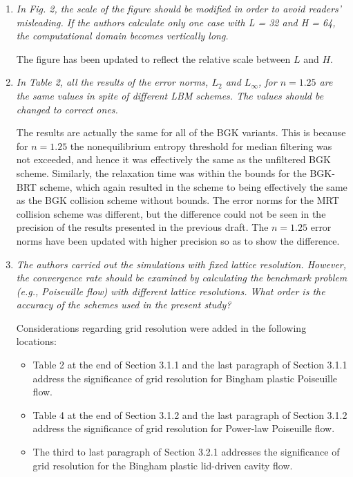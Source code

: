 \documentclass{article}
\begin{document}
	\begin{enumerate}
		\item \emph{In Fig. 2, the scale of the figure should be modified in order to avoid readers’ misleading. If the authors calculate only one case with L = 32 and H = 64, the computational domain becomes vertically long.}
		
		The figure has been updated to reflect the relative scale between $L$ and $H$.
		
		\item \emph{In Table 2, all the results of the error norms, $L_{2}$ and $L_{\infty}$, for $n = 1.25$ are the same values in spite of different LBM schemes. The values should be changed to correct ones.}
		
		The results are actually the same for all of the BGK variants.
		This is because for $n = 1.25$ the nonequilibrium entropy threshold for median filtering was not exceeded, and hence it was effectively the same as the unfiltered BGK scheme.
		Similarly, the relaxation time was within the bounds for the BGK-BRT scheme, which again resulted in the scheme to being effectively the same as the BGK collision scheme without bounds.
		The error norms for the MRT collision scheme was different, but the difference could not be seen in the precision of the results presented in the previous draft.
		The $n = 1.25$ error norms have been updated with higher precision so as to show the difference.
		
		\item \emph{The authors carried out the simulations with fixed lattice resolution. However, the convergence rate should be examined by calculating the benchmark problem (e.g., Poiseuille flow) with different lattice resolutions. 
		What order is the accuracy of the schemes used in the present study?}
	
		Considerations regarding grid resolution were added in the following locations:
		\begin{itemize}
			\item Table 2 at the end of Section 3.1.1 and the last paragraph of Section 3.1.1 address the significance of grid resolution for Bingham plastic Poiseuille flow.
			\item Table 4 at the end of Section 3.1.2 and the last paragraph of Section 3.1.2 address the significance of grid resolution for Power-law Poiseuille flow. 
			\item The third to last paragraph of Section 3.2.1 addresses the significance of grid resolution for the Bingham plastic lid-driven cavity flow.
		\end{itemize}
	\end{enumerate}
\end{document}
